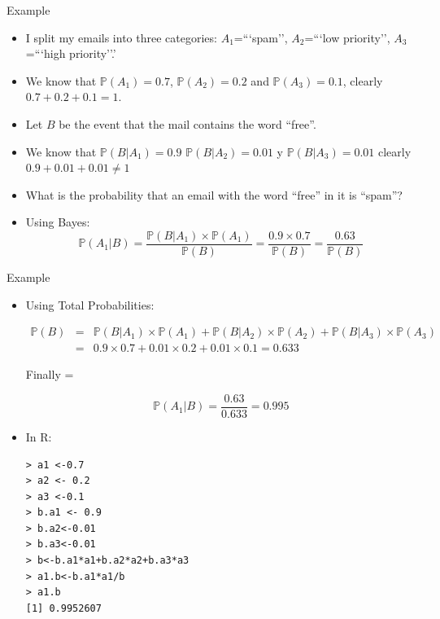 \documentclass[handout]{beamer}
\begin{document}
\begin{frame}{Example}
\scriptsize{
\begin{itemize}
 \item I split my emails into three categories: $A_1$=```spam'', $A_2$=```low priority'', $A_3$=```high priority''.'
 \item We know that $\mathbb{P}(A_1)=0.7$, $\mathbb{P}(A_2)=0.2$ and $\mathbb{P}(A_3)=0.1$, clearly $0.7+0.2+0.1=1$.
 \item Let $B$ be the event that the mail contains the word ``free''.
 \item We know that $\mathbb{P}(B|A_1)=0.9$ $\mathbb{P}(B|A_2)=0.01$ y $\mathbb{P}(B|A_3)=0.01$ clearly $0.9+0.01+0.01 \neq 1$
 \item  What is the probability that an email with the word ``free'' in it is ``spam''?
 \item Using Bayes:
 \begin{displaymath}
   \mathbb{P}(A_1|B) = \frac{\mathbb{P}(B|A_1)\times \mathbb{P}(A_1)}{\mathbb{P}(B)} = \frac{0.9 \times 0.7}{\mathbb{P}(B)} = \frac{0.63}{\mathbb{P}(B)}
 \end{displaymath}

 
\end{itemize}


} 
\end{frame}

\begin{frame}[fragile]{Example}
\scriptsize{
\begin{itemize}
 \item Using Total Probabilities:
 
  \begin{eqnarray*}
  \mathbb{P}(B) & = & \mathbb{P}(B|A_1)\times\mathbb{P}(A_1)+\mathbb{P}(B|A_2)\times\mathbb{P}(A_2)+\mathbb{P}(B|A_3)\times\mathbb{P}(A_3) \\
  & = & 0.9 \times 0.7 + 0.01 \times 0.2 + 0.01 \times 0.1 = 0.633
 \end{eqnarray*}

Finally =  


 
 
 \begin{displaymath}
  \mathbb{P}(A_1|B) = \frac{0.63}{0.633} = 0.995
 \end{displaymath}

\item In R:
\begin{verbatim}
> a1 <-0.7
> a2 <- 0.2
> a3 <-0.1
> b.a1 <- 0.9 
> b.a2<-0.01
> b.a3<-0.01
> b<-b.a1*a1+b.a2*a2+b.a3*a3
> a1.b<-b.a1*a1/b
> a1.b
[1] 0.9952607 
\end{verbatim}


\end{itemize}




} 
\end{frame}
\end{document}

